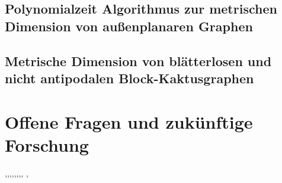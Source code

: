 \subsection{Polynomialzeit Algorithmus zur metrischen Dimension von außenplanaren Graphen}
\subsection{Metrische Dimension von blätterlosen und nicht antipodalen Block-Kaktusgraphen}

\section{Offene Fragen und zukünftige Forschung}
\cite{res},\cite{n-3},\cite{OnDet},\cite{Bounds},\cite{Discrep},\cite{Cartesian},\cite{upper},\cite{landmarks}, \cite{Erdos}, \cite{botmapdoag}

\pagebreak


\clearpage


\thispagestyle{empty}
\clearpage
\thispagestyle{empty}
\listoffigures
\thispagestyle{empty}
\listoftables
\thispagestyle{empty}

